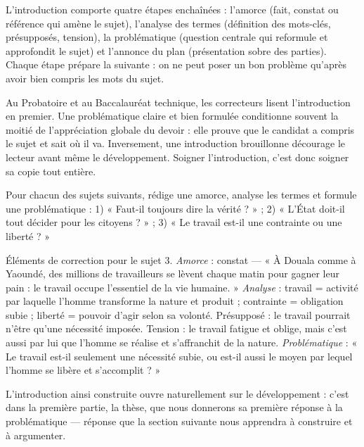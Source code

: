 \documentclass[11pt]{article}
\newcommand{\cle}[1]{{\popxbold\color{popdark}#1}}
\begin{document}
\begin{aretenir}[L'essentiel]
L'introduction comporte quatre étapes enchaînées : l'\cle{amorce} (fait, constat ou référence qui amène le sujet), l'\cle{analyse des termes} (définition des mots-clés, présupposés, tension), la \cle{problématique} (question centrale qui reformule et approfondit le sujet) et l'\cle{annonce du plan} (présentation sobre des parties). Chaque étape prépare la suivante : on ne peut poser un bon problème qu'après avoir bien compris les mots du sujet.
\end{aretenir}

\begin{savaistu}
Au Probatoire et au Baccalauréat technique, les correcteurs lisent l'introduction en premier. Une problématique claire et bien formulée conditionne souvent la moitié de l'appréciation globale du devoir : elle prouve que le candidat a compris le sujet et sait où il va. Inversement, une introduction brouillonne décourage le lecteur avant même le développement. Soigner l'introduction, c'est donc soigner sa copie tout entière.
\end{savaistu}

\begin{exercice}
Pour chacun des sujets suivants, rédige une amorce, analyse les termes et formule une problématique : 1) « Faut-il toujours dire la vérité ? » ; 2) « L'État doit-il tout décider pour les citoyens ? » ; 3) « Le travail est-il une contrainte ou une liberté ? »
\end{exercice}

\begin{corrige}
Éléments de correction pour le sujet 3. \emph{Amorce} : constat — « À Douala comme à Yaoundé, des millions de travailleurs se lèvent chaque matin pour gagner leur pain : le travail occupe l'essentiel de la vie humaine. » \emph{Analyse} : travail = activité par laquelle l'homme transforme la nature et produit ; contrainte = obligation subie ; liberté = pouvoir d'agir selon sa volonté. Présupposé : le travail pourrait n'être qu'une nécessité imposée. Tension : le travail fatigue et oblige, mais c'est aussi par lui que l'homme se réalise et s'affranchit de la nature. \emph{Problématique} : « Le travail est-il seulement une nécessité subie, ou est-il aussi le moyen par lequel l'homme se libère et s'accomplit ? »
\end{corrige}

L'introduction ainsi construite ouvre naturellement sur le développement : c'est dans la première partie, la thèse, que nous donnerons sa première réponse à la problématique — réponse que la section suivante nous apprendra à construire et à argumenter.
\end{document}
